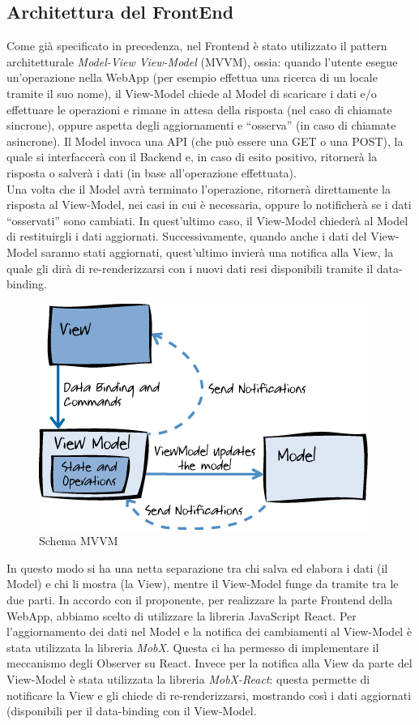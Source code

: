 \subsection{Architettura del FrontEnd}

Come già specificato in precedenza, nel Frontend è stato utilizzato il pattern architetturale \textit{Model-View View-Model} (MVVM), ossia: quando l’utente esegue un’operazione nella WebApp (per esempio effettua una ricerca di un locale tramite il suo nome), il View-Model chiede al Model di scaricare i dati e/o effettuare le operazioni e rimane in attesa della risposta (nel caso di chiamate sincrone), oppure aspetta degli aggiornamenti e “osserva” (in caso di chiamate asincrone). Il Model invoca una API (che può essere una GET o una POST), la quale si interfaccerà con il Backend e, in caso di esito positivo, ritornerà la risposta o salverà i dati (in base all'operazione effettuata). \\
Una volta che il Model avrà terminato l'operazione, ritornerà direttamente la risposta al View-Model, nei casi in cui è necessaria, oppure lo notificherà se i dati “osservati” sono cambiati. In quest'ultimo caso, il View-Model chiederà al Model di restituirgli i dati aggiornati. Successivamente, quando anche i dati del View-Model saranno stati aggiornati, quest'ultimo invierà una notifica alla View, la quale gli dirà di re-renderizzarsi con i nuovi dati resi disponibili tramite il data-binding. 

\begin{figure}[H]
    \centering
    \includegraphics[scale=0.5]{Contenuto/Immagini/MVVM.png}
    \caption{Schema MVVM}
\end{figure}

In questo modo si ha una netta separazione tra chi salva ed elabora i dati (il Model) e chi li mostra (la View), mentre il View-Model funge da tramite tra le due parti. 
In accordo con il proponente, per realizzare la parte Frontend della WebApp, abbiamo scelto di utilizzare la libreria JavaScript React. Per l'aggiornamento dei dati nel Model e la notifica dei cambiamenti al View-Model è stata utilizzata la libreria \textit{MobX}. Questa ci ha permesso di implementare il meccanismo degli Observer su React. 
Invece per la notifica alla View da parte del View-Model è stata utilizzata la libreria \textit{MobX-React}: questa permette di notificare la View e gli chiede di re-renderizzarsi, mostrando così i dati aggiornati (disponibili per il data-binding con il View-Model.



